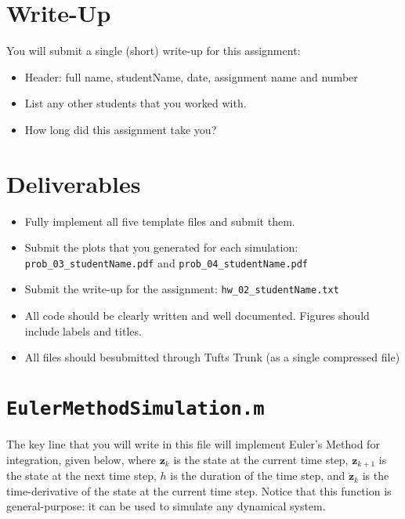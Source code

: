 \section*{Write-Up}

You will submit a single (short) write-up for this assignment:
\vspace{-0.0em} \begin{itemize}  \setlength\itemsep{0em} \setlength\itemindent{18pt}
  \item Header: full name, studentName, date, assignment name and number
  \item List any other students that you worked with.
  \item How long did this assignment take you?
\end{itemize}

\section*{Deliverables}
\begin{itemize}
  \item Fully implement all five template files and submit them.
  \item Submit the plots that you generated for each simulation: \\
        \texttt{prob\_03\_studentName.pdf}   and   \texttt{prob\_04\_studentName.pdf}
  \item Submit the write-up for the assignment:   \texttt{hw\_02\_studentName.txt}
  \item All code should be clearly written and well documented. Figures should include labels and titles.
  \item All files should besubmitted through Tufts Trunk (as a single compressed file)
\end{itemize}


\pagebreak
\section*{\texttt{EulerMethodSimulation.m}}

The key line that you will write in this file will implement Euler's Method for integration,
given below, where $\bm{z}_k$ is the state at the current time step, $\bm{z}_{k+1}$ is the state
at the next time step, $h$ is the duration of the time step, and $\dot{\bm{z}}_k$ is the time-derivative
of the state at the current time step.
Notice that this function is general-purpose: it can be used to simulate any dynamical system.

